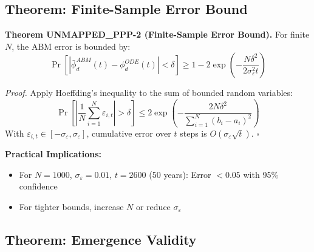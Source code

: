 \subsection{Theorem: Finite-Sample Error Bound}

\begin{tcolorbox}[colback=green!5!white, colframe=green!75!black, title=Theorem UNMAPPED_PPP-2: Finite-Sample Error]
\textbf{Theorem UNMAPPED_PPP-2 (Finite-Sample Error Bound).}
For finite $N$, the ABM error is bounded by:
\begin{equation}
\Pr\left[|\bar{\phi}^{ABM}_d(t) - \phi^{ODE}_d(t)| < \delta\right] \geq 1 - 2\exp\left(-\frac{N\delta^2}{2\sigma^2_\varepsilon t}\right)
\label{eq:ppp-error-bound}
\end{equation}

\textit{Proof.}
Apply Hoeffding's inequality to the sum of bounded random variables:
\begin{equation}
\Pr\left[\left|\frac{1}{N}\sum_{i=1}^{N} \varepsilon_{i,t}\right| > \delta\right] \leq 2\exp\left(-\frac{2N\delta^2}{\sum_{i=1}^{N}(b_i - a_i)^2}\right)
\end{equation}
With $\varepsilon_{i,t} \in [-\sigma_\varepsilon, \sigma_\varepsilon]$, cumulative error over $t$ steps is $O(\sigma_\varepsilon \sqrt{t})$.
\hfill $\square$
\end{tcolorbox}

\textbf{Practical Implications:}
\begin{itemize}[nosep]
\item For $N = 1000$, $\sigma_\varepsilon = 0.01$, $t = 2600$ (50 years): Error $< 0.05$ with 95\% confidence
\item For tighter bounds, increase $N$ or reduce $\sigma_\varepsilon$
\end{itemize}

\subsection{Theorem: Emergence Validity}

